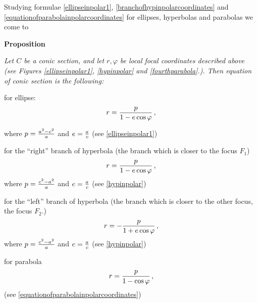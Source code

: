 \documentclass[12pt]{article}
\numberwithin{equation}{section}
\begin{document}
{\footnotesize

Studying formulae 
\eqref{ellipseinpolar1},
\eqref{branchofhypinpolarcoordinates} and
\eqref{equationofparabolainpolarcoordinates}
for ellipses, hyperbolas and parabolas we come to 
   
{\bf Proposition}
  {\it Let $C$ be a conic section, and 
let $r,\varphi$ be local focal 
coordinates described above
  (see Figures \eqref{ellipseinpolar1}, \eqref{hypinpolar} and 
\eqref{fourthparabola}.). 
Then equation of conic section 
is the  following:

  \begin{itemize}

\item  for ellipse: 
               \begin{equation*}\label{conicsectioninpolarcoordinates1}
              r={p\over 1-e\cos\varphi}\,,
               \end{equation*}
  
where $p={a^2-c^2\over a}$ and $e={a\over c}$ 
(see \eqref{ellipseinpolar1})

{\footnotesize
\item   for the  ``right'' branch of hyperbola
(the branch which is closer to the focus $F_1$)
 \begin{equation*}\label{conicsectioninpolarcoordinates2}
              r={p\over 1-e\cos\varphi}\,,
               \end{equation*}
  where $p={c^2-a^2\over a}$ and $e={a\over c}$ (see \eqref{hypinpolar})




\item  for the  ``left'' branch of hyperbola
(the branch which is closer to the other focus, the focus $F_2$.)
 \begin{equation*}\label{conicsectioninpolarcoordinates2}
              r=-{p\over 1+e\cos\varphi}\,,
               \end{equation*}
  where $p={c^2-a^2\over a}$ and $e={a\over c}$ (see \eqref{hypinpolar})


}



\item for parabola
 \begin{equation*}\label{conicsectioninpolarcoordinates3}
              r={p\over 1-\cos\varphi}\,,
               \end{equation*}
  (see \eqref{equationofparabolainpolarcoordinates})

\end{itemize}
}


}
\end{document}
